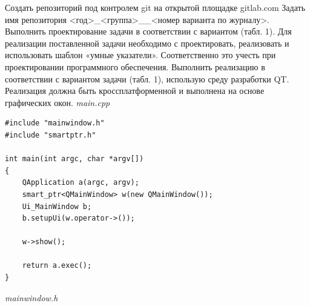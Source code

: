 \documentclass[a4paper,14pt]{extarticle}
\begin{document}
Создать репозиторий под контролем git на открытой площадке gitlab.com
Задать имя репозитория <год>\_<группа>\_<имя студента в транслите>\_<номер
варианта по журналу>. Выполнить проектирование задачи в соответствии с вариантом (табл. 1).
Для реализации поставленной задачи необходимо с проектировать, реализовать
и использовать шаблон «умные указатели». Соответственно это учесть при
проектировании программного обеспечения. Выполнить реализацию в соответствии с вариантом задачи (табл. 1),
использую среду разработки QT. Реализация должна быть кроссплатформенной
и выполнена на основе графических окон.
\textit{main.cpp}
\begin{verbatim}
#include "mainwindow.h"
#include "smartptr.h"

int main(int argc, char *argv[])
{
    QApplication a(argc, argv);
    smart_ptr<QMainWindow> w(new QMainWindow());
    Ui_MainWindow b;
    b.setupUi(w.operator->());

    w->show();

    return a.exec();
}
\end{verbatim}
\textit{mainwindow.h}
\end{document}
